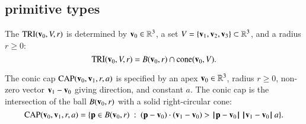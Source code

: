 \subsection{primitive types}
%

\begin{definition}
 The 
${\operatorname{TRI}}({\mathbf v}_0,V,r)$ is determined by ${\mathbf v}_0\in\mathbb{R}^3$, a 
set $V=\{{\mathbf v}_1,{\mathbf v}_2,{\mathbf v}_3\}\subset\mathbb{R}^3$, and a radius $r\ge0$:
\[ 
{\operatorname{TRI}}({\mathbf v}_0,V,r) = 
B({\mathbf v}_0,r)\cap {\operatorname{cone}}({\mathbf v}_0,V).
\] 
%
%
%
\end{definition}



%


\begin{definition}
The conic cap ${\operatorname{CAP}}({\mathbf v}_0,{\mathbf v}_1,r,a)$ is specified by an apex
${\mathbf v}_0\in\mathbb{R}^3$,  radius $r\ge0$,  non-zero vector ${\mathbf v}_1-{\mathbf v}_0$ giving
direction, and constant $a$.  The conic cap is the intersection of
the ball $B({\mathbf v}_0,r)$ with a solid right-circular cone:
\[ 
\op{CAP}(\v_0,\v_1,r,a)=\{\p \in B(\v_0,r) 
\mid (\p-\v_0)\cdot (\v_1-\v_0) > \norm{\p}{\v_0}\, \norm{\v_1}{\v_0}\, a\}.
\] 
%
%
%
%
\end{definition}

%

